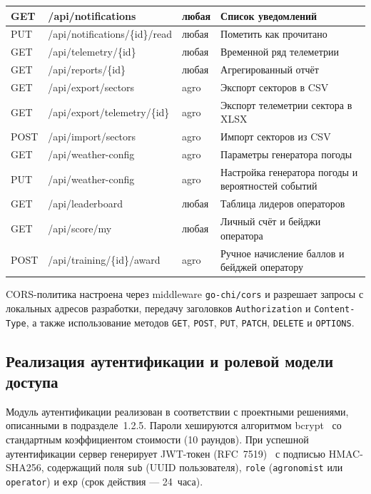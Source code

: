 \begin{longtable}{|l|l|l|p{4.8cm}|}
    GET  & /api/notifications & любая & Список уведомлений \\ \hline
    PUT  & /api/notifications/\{id\}/read & любая & Пометить как прочитано \\ \hline
    GET  & /api/telemetry/\{id\} & любая & Временной ряд телеметрии \\ \hline
    GET  & /api/reports/\{id\} & любая & Агрегированный отчёт \\ \hline
    GET  & /api/export/sectors & agro & Экспорт секторов в CSV \\ \hline
    GET  & /api/export/telemetry/\{id\} & agro & Экспорт телеметрии сектора в XLSX \\ \hline
    POST & /api/import/sectors & agro & Импорт секторов из CSV \\ \hline
    GET  & /api/weather-config & agro & Параметры генератора погоды \\ \hline
    PUT  & /api/weather-config & agro & Настройка генератора погоды и вероятностей событий \\ \hline
    GET  & /api/leaderboard & любая & Таблица лидеров операторов \\ \hline
    GET  & /api/score/my & любая & Личный счёт и бейджи оператора \\ \hline
    POST & /api/training/\{id\}/award & agro & Ручное начисление баллов и бейджей оператору \\ \hline
\end{longtable}

CORS-политика настроена через middleware \texttt{go-chi/cors}
и разрешает запросы с локальных адресов разработки,
передачу заголовков \texttt{Authorization} и
\texttt{Content-Type}, а также использование методов
\texttt{GET}, \texttt{POST}, \texttt{PUT}, \texttt{PATCH},
\texttt{DELETE} и \texttt{OPTIONS}.


\subsection{Реализация аутентификации и ролевой модели доступа}

Модуль аутентификации реализован в соответствии с проектными
решениями, описанными в подразделе~1.2.5. Пароли хешируются
алгоритмом bcrypt~\cite{provos_mazieres_1999,pkggo_bcrypt} со
стандартным коэффициентом стоимости (10 раундов). При успешной
аутентификации сервер генерирует JWT-токен
(RFC~7519)~\cite{rfc7519_ietf,jwt_io_intro} с подписью
HMAC-SHA256, содержащий поля \texttt{sub} (UUID пользователя),
\texttt{role} (\texttt{agronomist} или \texttt{operator}) и
\texttt{exp} (срок действия --- 24~часа).

